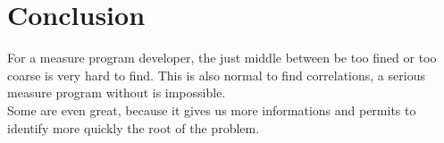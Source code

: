 \documentclass{article}
\begin{document}
\section{Conclusion}
For a measure program developer, the just middle between be too fined or too coarse is very  hard to find. This is also normal to find correlations, a serious measure program without is impossible. \\ Some are even great, because it gives us more informations and permits to identify more quickly the root of the problem. \\
\end{document}
